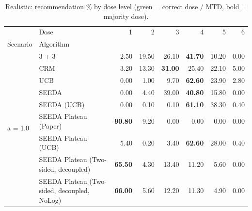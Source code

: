 \begin{table}[H]
\centering
\caption{Realistic: recommendation \% by dose level (green = correct dose / MTD, bold = majority dose).}
\label{tab:real_rec_by_dose}
\begin{tabular}{llrrrrrr}
\toprule
 & Dose & 1 & 2 & 3 & 4 & 5 & 6 \\
Scenario & Algorithm &  &  &  &  &  &  \\
\midrule
\multirow[c]{9}{*}{a = 1.0} & 3 + 3 & 2.50 & 19.50 & {\cellcolor[HTML]{C8E6C9}} 26.10 & \bfseries 41.70 & 10.20 & 0.00 \\
 & CRM & 3.20 & 13.30 & {\cellcolor[HTML]{C8E6C9}} \bfseries 31.00 & 25.40 & 22.10 & 5.00 \\
 & UCB & 0.00 & 1.00 & {\cellcolor[HTML]{C8E6C9}} 9.70 & \bfseries 62.60 & 23.90 & 2.80 \\
 & SEEDA & 0.00 & 4.40 & {\cellcolor[HTML]{C8E6C9}} 39.00 & \bfseries 40.80 & 15.80 & 0.00 \\
 & SEEDA (UCB) & 0.00 & 0.10 & {\cellcolor[HTML]{C8E6C9}} 0.10 & \bfseries 61.10 & 38.30 & 0.40 \\
 & SEEDA Plateau (Paper) & \bfseries 90.80 & 9.20 & {\cellcolor[HTML]{C8E6C9}} 0.00 & 0.00 & 0.00 & 0.00 \\
 & SEEDA Plateau (UCB) & 5.40 & 0.20 & {\cellcolor[HTML]{C8E6C9}} 3.40 & \bfseries 62.60 & 28.00 & 0.40 \\
 & SEEDA Plateau (Two-sided, decoupled) & \bfseries 65.50 & 4.30 & {\cellcolor[HTML]{C8E6C9}} 13.40 & 11.20 & 5.60 & 0.00 \\
 & SEEDA Plateau (Two-sided, decoupled, NoLog) & \bfseries 66.00 & 5.60 & {\cellcolor[HTML]{C8E6C9}} 12.20 & 11.30 & 4.90 & 0.00 \\
\bottomrule
\end{tabular}
\end{table}
